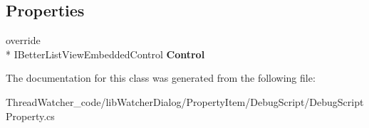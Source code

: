 \subsection*{Properties}
\begin{DoxyCompactItemize}
\item 
\hypertarget{classlib_watcher_dialog_1_1_property_item_1_1_debug_script_1_1_debug_script_property_a6373502c2ed38baa063799545a1341de}{override \\*
I\+Better\+List\+View\+Embedded\+Control {\bfseries Control}}\label{classlib_watcher_dialog_1_1_property_item_1_1_debug_script_1_1_debug_script_property_a6373502c2ed38baa063799545a1341de}

\end{DoxyCompactItemize}


The documentation for this class was generated from the following file\+:\begin{DoxyCompactItemize}
\item 
Thread\+Watcher\+\_\+code/lib\+Watcher\+Dialog/\+Property\+Item/\+Debug\+Script/Debug\+Script\+Property.\+cs\end{DoxyCompactItemize}
